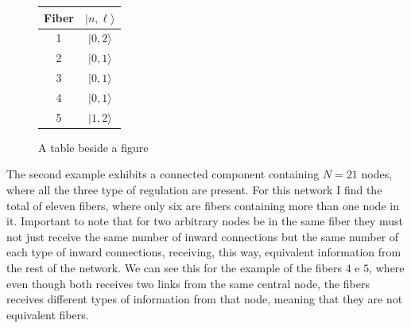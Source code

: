 \documentclass[12pt]{diazessay} %
\begin{document}
\begin{figure}[!ht]
    \centering
    \qquad
    \begin{tabular}[b]{cc}\hline
      Fiber & $| n, \ell \rangle$  \\ \hline
      1 & $| 0, 2 \rangle$ \\
      2 & $| 0, 1 \rangle$ \\
      3 & $| 0, 1 \rangle$ \\ 
      4 & $| 0, 1 \rangle$ \\
      5 & $| 1, 2 \rangle$ \\ \hline
	\end{tabular}
    \caption{A table beside a figure}
\end{figure}

The second example exhibits a connected component containing $N = 21$ nodes, where all the three type of regulation are present. For this network I find the total of eleven fibers, where only six are fibers containing more than one node in it. Important to note that for two arbitrary nodes be in the same fiber they must not just receive the same number of inward connections but the same number of each type of inward connections, receiving, this way, equivalent information from the rest of the network. We can see this for the example of the fibers $4$ e $5$, where even though both receives two links from the same central node, the fibers receives different types of information from that node, meaning that they are not equivalent fibers.
\end{document}
